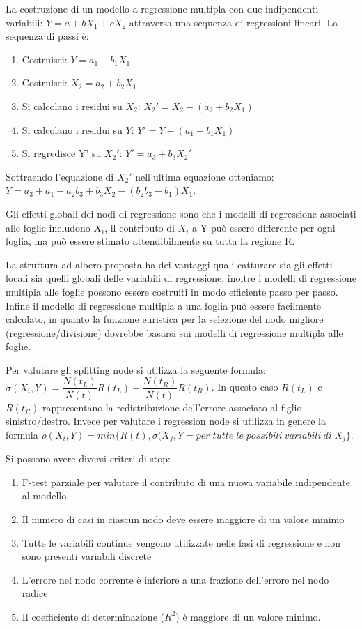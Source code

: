 \documentclass[a4paper]{extarticle}
\begin{document}
La costruzione di un modello a regressione multipla con due indipendenti variabili: $Y = a + bX_1 + cX_2$ attraversa una sequenza di regressioni lineari. La sequenza di passi è:

\begin{enumerate}
\item Costruisci: $Y = a_1 + b_1X_1$
\item Costruisci: $X_2 = a_2 + b_2X_1$
\item Si calcolano i residui su $X_2$: $X_2' = X_2 - (a_2 + b_2X_1)$
\item Si calcolano i residui su $Y$: $Y' = Y - (a_1 + b_1X_1)$
\item Si regredisce Y' su $X_2'$: $Y' = a_3 + b_3X_2'$
\end{enumerate}

Sottraendo l'equazione di $X_2'$ nell'ultima equazione otteniamo: $Y = a_3 + a_1 - a_2b_3 + b_3X_2 - (b_2b_3-b_1)X_1$. 

Gli effetti globali dei nodi di regressione sono che i modelli di regressione associati alle foglie includono $X_i$, il contributo di $X_i$ a Y può essere differente per ogni foglia, ma può essere stimato attendibilmente su tutta la regione R.

La struttura ad albero proposta ha dei vantaggi quali catturare sia gli effetti locali sia quelli globali delle variabili di regressione, inoltre i modelli di regressione multipla alle foglie possono essere costruiti in modo efficiente passo per passo. Infine il modello di regressione multipla a una foglia può essere facilmente calcolato, in quanto la funzione euristica per la selezione del nodo migliore (regressione/divisione) dovrebbe basarsi sui modelli di regressione multipla alle foglie.

Per valutare gli splitting node si utilizza la seguente formula: $\sigma(X_i,Y) = \dfrac{N(t_L)}{N(t)}R(t_L) + \dfrac{N(t_R)}{N(t)}R(t_R)$. In questo caso $R(t_L)$ e $R(t_R)$ rappresentano la redistribuzione dell'errore associato al figlio sinistro/destro. Invece per valutare i regression node si utilizza in genere la formula $\rho(X_i,Y) = min \{ R(t), \sigma(X_j, Y= per \; tutte \; le \; possibili \: variabili \: di \; X_j\}$.

Si possono avere diversi criteri di stop:

\begin{enumerate}
\item F-test parziale per valutare il contributo di una nuova variabile indipendente al modello.
\item Il numero di casi in ciascun nodo deve essere maggiore di un valore minimo
\item Tutte le variabili continue vengono utilizzate nelle fasi di regressione e non sono presenti variabili discrete
\item L'errore nel nodo corrente è inferiore a una frazione dell'errore nel nodo radice
\item Il coefficiente di determinazione ($R^2$) è maggiore di un valore minimo.
\end{enumerate}
\end{document}

